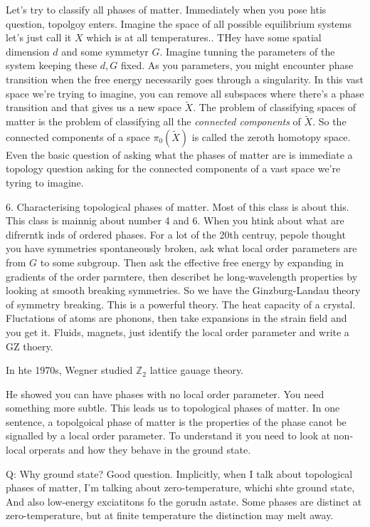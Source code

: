 Let's try to classify all phases of matter.
Immediately when you pose htis question, topolgoy enters.
Imagine the space of all possible equilibrium systems let's just call it $X$
which is at all temperatures..
THey have some spatial dimension $d$ and some symmetyr $G$.
Imagine tunning the parameters of the system keeping these $d,G$ fixed.
As you parameters, you might encounter phase transition when the free energy
necessarily goes through a singularity.
In this vast space we're trying to imagine, you can remove all subspaces where
there's a phase transition and that gives us a new space $\tilde{X}$.
The problem of classifying spaces of matter is the problem of classifying all
the \emph{connected components} of $\tilde{X}$.
So the connected components of a space $\pi_0(\tilde{X})$ is called the zeroth
homotopy space.
Even the basic question of asking what the phases of matter are is immediate a
topology question asking for the connected components of a vast space we're
tyring to imagine.

6. Characterising topological phases of matter.
Most of this class is about this.
This class is mainnig about number 4 and 6.
When you htink about what are difrerntk inds of ordered phases.
For a lot of the 20th centruy, pepole thought you have symmetries spontaneously
broken, ask what local order parameters are from $G$ to some subgroup.
Then ask the effective free energy by expanding in gradients of the order
parmtere, then describet he long-wavelength properties by looking at smooth
breaking symmetries.
So we have the Ginzburg-Landau theory of symmetry breaking.
This is a powerful theory.
The heat capacity of a crystal.
Fluctations of atoms are phonons, then take expansions in the strain field and
you get it.
Fluids, magnets, just identify the local order parameter and write a GZ thoery.

In hte 1970s, Wegner studied $\mathbb{Z}_2$ lattice gauage theory.

He showed you can have phases with no local order parameter.
You need something more subtle.
This leads us to topological phases of matter.
In one sentence, a topolgoical phase of matter is the properties of the phase
canot be signalled by a local order parameter.
To understand it you need to look at non-local orperats and how they behave in
the ground state.

Q: Why ground state?
Good question.
Implicitly, when I talk about topological phases of matter, I'm talking about
zero-temperature, whichi shte ground state,
And also low-energy exciatitons fo the gorudn astate.
Some phases are distinct at zero-temperature, but at finite temperature the
distinction may melt away.

